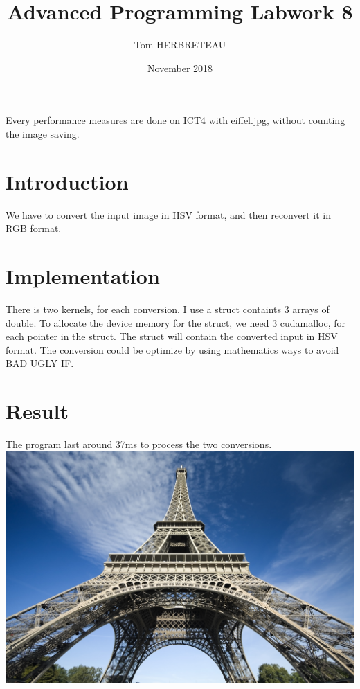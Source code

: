 \documentclass{article}
\title{Advanced Programming Labwork 8}
\author{Tom HERBRETEAU }
\date{November 2018}
\begin{document}
\maketitle
Every performance measures are done on ICT4 with eiffel.jpg, without counting the image saving.
\section{Introduction}
We have to convert the input image in HSV format, and then reconvert it in RGB format.
\section{Implementation}
There is two kernels, for each conversion.
I use a struct containts 3 arrays of double. To allocate the device memory for the struct, we need 3 cudamalloc, for each pointer in the struct. The struct will contain the converted input in HSV format. The conversion could be optimize by using mathematics ways to avoid BAD UGLY IF.

\section{Result}
The program last around 37ms to process the two conversions.
\newline
\includegraphics[width=\textwidth]{labwork8-gpu-out.jpg}

\end{document}

